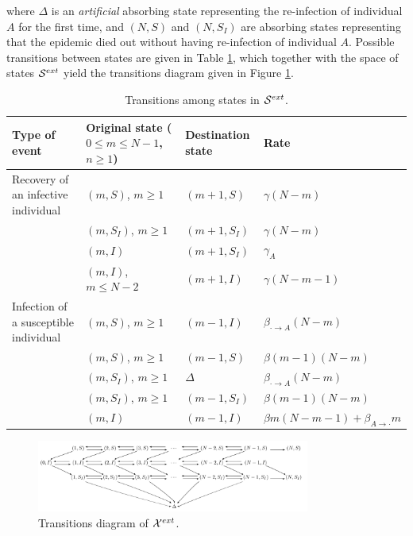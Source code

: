 \documentclass[10pt,A4paper]{article}
\begin{document}
\par\noindent where $\Delta$ is an {\it artificial} absorbing state representing the re-infection of individual $A$ for the first time, and $(N,S)$
and $(N,S_I)$ are absorbing states representing that the epidemic died out without having re-infection of individual $A$. Possible
transitions between states are given in Table \ref{tab:1}, which together with the space of states ${\cal S}^{ext}$ yield the transitions
diagram given in Figure \ref{fig:3}.
\begin{table}[h]
\centering
\begin{tabular}{|l|l|l|l|}
\hline
Type of event & Original state ($0\leq m\leq N-1$, $n\geq1$) & Destination state & Rate\\
\hline
Recovery of an infective individual & $(m,S)$, $m\geq1$ & $(m+1,S)$ & $\gamma(N-m)$\\
 & $(m,S_I)$, $m\geq1$ & $(m+1,S_I)$ & $\gamma(N-m)$\\
 & $(m,I)$ & $(m+1,S_I)$ & $\gamma_A$\\
 & $(m,I)$, $m\leq N-2$ & $(m+1,I)$ & $\gamma(N-m-1)$\\
\hline
Infection of a susceptible individual & $(m,S)$, $m\geq1$ & $(m-1,I)$ & $\beta_{\cdot\rightarrow A}(N-m)$\\
 & $(m,S)$, $m\geq1$ & $(m-1,S)$ & $\beta(m-1)(N-m)$\\
 & $(m,S_I)$, $m\geq1$ & $\Delta$ & $\beta_{\cdot\rightarrow A}(N-m)$\\
 & $(m,S_I)$, $m\geq1$ & $(m-1,S_I)$ & $\beta(m-1)(N-m)$\\
 & $(m,I)$ & $(m-1,I)$ & $\beta m(N-m-1)+\beta_{A\rightarrow\cdot}m$\\
\hline
\end{tabular}
\caption{Transitions among states in ${\cal S}^{ext}$.}
\label{tab:1}
\end{table}

\begin{figure}[h!]
\centering
 \includegraphics[width=0.8\textwidth]{Figure3.jpg}
\caption{Transitions diagram of ${\cal X}^{ext}$.}
\label{fig:3}
\end{figure}
\end{document}
